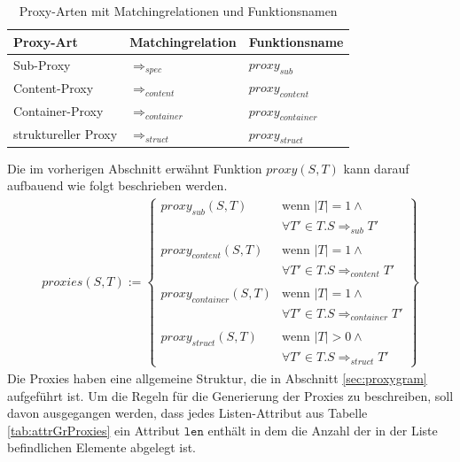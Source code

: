\documentclass[a4paper,12pt]{article}
\begin{document}
\begin{table}[H]
\centering
\begin{tabular}{|p{4cm}|p{4cm}|p{3cm}|}
\hline
\hline
\centering\textbf{Proxy-Art} & \textbf{Matchingrelation} & \textbf{Funktionsname}\\
\hline
\hline
Sub-Proxy
&  
$\Rightarrow_{spec}$
& 
$\mathit{proxy_{sub}}$
\\
\hline
Content-Proxy
& 
$\Rightarrow_{content}$
& 
$\mathit{proxy_{content}}$
\\
\hline
Container-Proxy
& 
$\Rightarrow_{container}$
& 
$\mathit{proxy_{container}}$
\\
\hline
struktureller Proxy
&
$\Rightarrow_{struct}$
& 
$\mathit{proxy_{struct}}$
 \\
\hline
\hline
\end{tabular}
\caption{Proxy-Arten mit Matchingrelationen und Funktionsnamen}
 \label{tab:baseMatcher}
\end{table}
\noindent
Die im vorherigen Abschnitt erwähnt Funktion $\mathit{proxy(S,T)}$ kann darauf aufbauend wie folgt beschrieben werden.
\begin{gather*}
\mathit{proxies(S,T)} := 
\left\{\begin{array}{ll}
\mathit{proxy_{sub}(S,T)}	& \text{wenn } |T| = 1 \wedge \mathit{ }\\
& \forall T' \in T. S \Rightarrow_{sub} T'\\	
&\\
\mathit{proxy_{content}(S,T)}	& \text{wenn } |T| = 1 \wedge \mathit{ }\\
& \forall T' \in T. S \Rightarrow_{content} T' \\
&\\
\mathit{proxy_{container}(S,T)} & \text{wenn } |T| = 1 \wedge \mathit{ } \\
& \forall T' \in T. S \Rightarrow_{container} T' \\
&\\
\mathit{proxy_{struct}(S,T)} & \text{wenn } |T| > 0 \wedge \mathit{ } \\
&\forall T' \in T. S \Rightarrow_{struct} T'
		 \end{array}
\right\}
\end{gather*}
\noindent
Die Proxies haben eine allgemeine Struktur, die in Abschnitt \ref{sec:proxygram} aufgeführt ist. Um die Regeln für die Generierung der Proxies zu beschreiben, soll davon ausgegangen werden, dass jedes Listen-Attribut aus Tabelle \ref{tab:attrGrProxies} ein Attribut $\texttt{len}$ enthält in dem die Anzahl der in der Liste befindlichen Elemente abgelegt ist.
\end{document}
